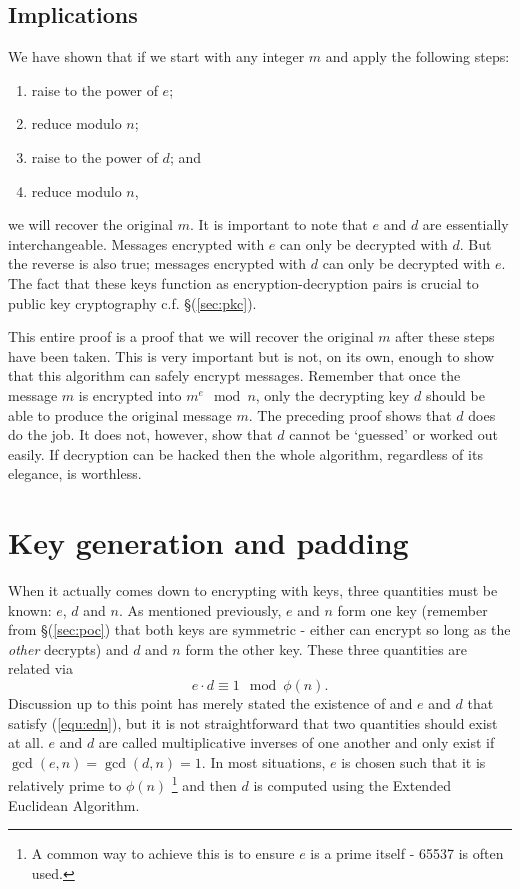\documentclass[]{scrartcl}
\theoremstyle{definition}
\renewcommand{\sec}[1]{\S \ref{#1}}
\let\oldref\ref
\renewcommand{\ref}[1]{(\oldref{#1})}
\begin{document}
\subsection{Implications}
We have shown that if we start with any integer $m$ and apply the following steps:
\begin{enumerate}
    \item raise to the power of $e$;
    \item reduce modulo $n$;
    \item raise to the power of $d$; and
    \item reduce modulo $n$,
\end{enumerate}
we will recover the original $m$. It is important to note that $e$ and $d$ are essentially interchangeable. Messages encrypted with $e$ can only be decrypted with $d$. But the reverse is also true; messages encrypted with $d$ can only be decrypted with $e$. The fact that these keys function as encryption-decryption pairs is crucial to public key cryptography c.f. \sec{sec:pkc}.

This entire proof is a proof that we will recover the original $m$ after these steps have been taken. This is very important but is not, on its own, enough to show that this algorithm can safely encrypt messages. Remember that once the message $m$ is encrypted into $m^e \mod n$, only the decrypting key $d$ should be able to produce the original message $m$. The preceding proof shows that $d$ does do the job. It does not, however, show that $d$ cannot be `guessed' or worked out easily. If decryption can be hacked then the whole algorithm, regardless of its elegance, is worthless.

\section{Key generation and padding}\label{sec:gen-pad}
When it actually comes down to encrypting with keys, three quantities must be known: $e$, $d$ and $n$. As mentioned previously, $e$ and $n$ form one key (remember from \sec{sec:poc} that both keys are symmetric - either can encrypt so long as the \textit{other} decrypts) and $d$ and $n$ form the other key. These three quantities are related via
\begin{equation}\label{equ:edn}
    e\cdot d \equiv 1 \mod \phi(n).
\end{equation}
Discussion up to this point has merely stated the existence of and $e$ and $d$ that satisfy \ref{equ:edn}, but it is not straightforward that two quantities should exist at all. $e$ and $d$ are called multiplicative inverses of one another and only exist if $\gcd(e,n)=\gcd(d,n)=1$. In most situations, $e$ is chosen such that it is relatively prime to $\phi(n)$ \footnote{A common way to achieve this is to ensure $e$ is a prime itself - 65537 is often used.} and then $d$ is computed using the Extended Euclidean Algorithm.
\end{document}
